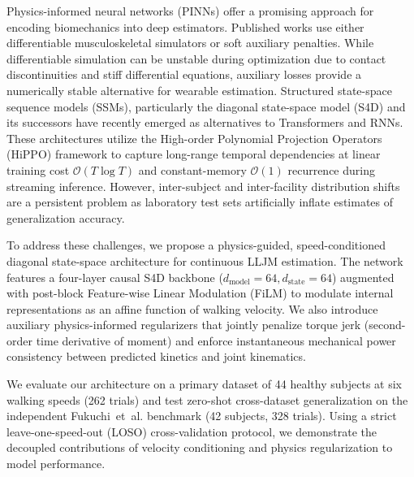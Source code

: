 \documentclass[fleqn,10pt]{wlscirep}
\newcommand{\dmodel}{d_{\mathrm{model}}}
\newcommand{\dstate}{d_{\mathrm{state}}}
\begin{document}
Physics-informed neural networks (PINNs)\cite{karniadakis2021physics} offer a promising approach for encoding biomechanics into deep estimators. Published works use either differentiable musculoskeletal simulators\cite{werling2021fast} or soft auxiliary penalties\cite{dorschky2019cnn, stanev2020learning}. While differentiable simulation can be unstable during optimization due to contact discontinuities and stiff differential equations\cite{werling2021fast}, auxiliary losses provide a numerically stable alternative for wearable estimation\cite{dorschky2019cnn}. Structured state-space sequence models (SSMs), particularly the diagonal state-space model (S4D)\cite{gu2022parameterization} and its successors\cite{smith2023s5, gu2024mamba} have recently emerged as alternatives to Transformers and RNNs. These architectures utilize the High-order Polynomial Projection Operators (HiPPO) framework\cite{goel2022s} to capture long-range temporal dependencies at linear training cost $\mathcal{O}(T \log T)$ and constant-memory $\mathcal{O}(1)$ recurrence during streaming inference. However, inter-subject and inter-facility distribution shifts are a persistent problem\cite{halilaj2018machine, gholami2020subject} as laboratory test sets artificially inflate estimates of generalization accuracy\cite{mundt2021estimation}.

To address these challenges, we propose a physics-guided, speed-conditioned diagonal state-space architecture for continuous LLJM estimation. The network features a four-layer causal S4D backbone ($\dmodel = 64, \dstate = 64$) augmented with post-block Feature-wise Linear Modulation (FiLM)\cite{perez2018film} to modulate internal representations as an affine function of walking velocity. We also introduce auxiliary physics-informed regularizers that jointly penalize torque jerk (second-order time derivative of moment) and enforce instantaneous mechanical power consistency between predicted kinetics and joint kinematics.

We evaluate our architecture on a primary dataset of 44 healthy subjects at six walking speeds (262 trials) and test zero-shot cross-dataset generalization on the independent Fukuchi~et~al.\cite{fukuchi2018public} benchmark (42 subjects, 328 trials). Using a strict leave-one-speed-out (LOSO) cross-validation protocol, we demonstrate the decoupled contributions of velocity conditioning and physics regularization to model performance.
\end{document}
